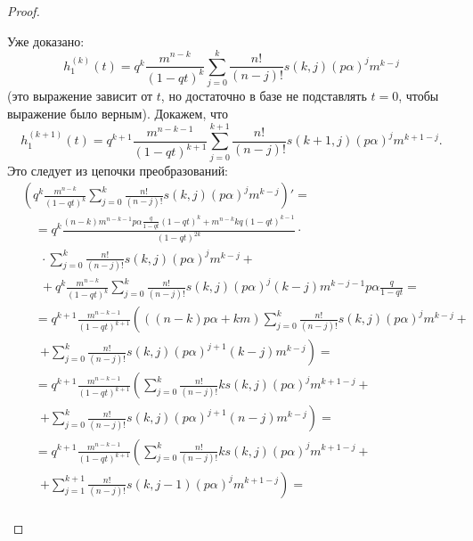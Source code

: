 \documentclass[12pt, specialist, subf, substylefile = spbu.rtx]{disser}
\begin{document}
\begin{proof}
\begin{enumerate}
			Уже доказано:
			\[
				h _1 ^{(k)} (t) = q ^k \frac {m ^{n - k}} {(1 - qt) ^k} \sum \limits ^k _{j = 0} \frac {n !} {(n - j)!} s(k, j) (p \alpha) ^j m ^{k - j}
			\]
			(это выражение зависит от $t$, но достаточно в базе не подставлять $t = 0$, чтобы выражение было верным). Докажем, что
			\[
				h _1 ^{(k + 1)} (t) = q ^{k + 1} \frac {m ^{n - k - 1}} {(1 - qt) ^{k + 1}} \sum \limits ^{k + 1} _{j = 0} \frac {n !} {(n - j)!} s(k + 1, j) (p \alpha) ^j m ^{k + 1 - j}.
			\]
			Это следует из цепочки преобразований:
			\[
				\begin{aligned}
					&\left(q ^k \frac {m ^{n - k}} {(1 - qt) ^k} \sum \limits ^k _{j = 0} \frac {n !} {(n - j)!} s(k, j) (p \alpha) ^j m ^{k - j}\right)' =\\
					&\quad= q ^k \frac	{(n - k)m ^{n - k - 1} p \alpha \frac{q}{1 - qt} (1 - qt) ^k + m ^{n - k} kq (1 - qt) ^{k - 1}} {(1 - qt) ^{2k}} \cdot\\
					&\quad~~\cdot \sum \limits ^k _{j = 0} \frac {n !} {(n - j)!} s(k, j) (p \alpha) ^j m ^{k - j} +\\
					&\quad~~ + q ^k \frac {m ^{n - k}} {(1 - qt) ^k} \sum \limits ^k _{j = 0} \frac {n !} {(n - j)!} s(k, j) (p \alpha) ^j (k - j)m ^{k - j - 1} p \alpha \frac{q}{1 - qt} =\\
					&\quad= q ^{k + 1} \frac {m ^{n - k - 1}} {(1 - qt) ^{k + 1}} \left(\left((n - k) p \alpha + km\right) \sum \limits ^k _{j = 0} \frac {n !} {(n - j)!} s(k, j) (p \alpha) ^j m ^{k - j} +\right.\\
					&\quad~~ \left.+ \sum \limits ^k _{j = 0} \frac {n !} {(n - j)!} s(k, j) (p \alpha) ^{j + 1} (k - j)m ^{k - j} \right)=\\
					&\quad= q ^{k + 1} \frac {m ^{n - k - 1}} {(1 - qt) ^{k + 1}} \left(\sum \limits ^k _{j = 0} \frac {n !} {(n - j)!} k s(k, j) (p \alpha) ^j m ^{k + 1 - j} +\right.\\
					&\quad~~\left.+ \sum \limits ^k _{j = 0} \frac {n !} {(n - j)!} s(k, j) (p \alpha) ^{j + 1} (n - j)m ^{k - j} \right)=\\
					&\quad= q ^{k + 1} \frac {m ^{n - k - 1}} {(1 - qt) ^{k + 1}} \left(\sum \limits ^k _{j = 0} \frac {n !} {(n - j)!} k s(k, j) (p \alpha) ^j m ^{k + 1 - j} +\right.\\
					&\quad~~ \left.+ \sum \limits ^{k + 1} _{j = 1} \frac {n !} {(n - j)!} s(k, j - 1) (p \alpha) ^j m ^{k + 1 - j} \right)=\\

\end{aligned}\]
\end{enumerate}
\end{proof}
\end{document}
